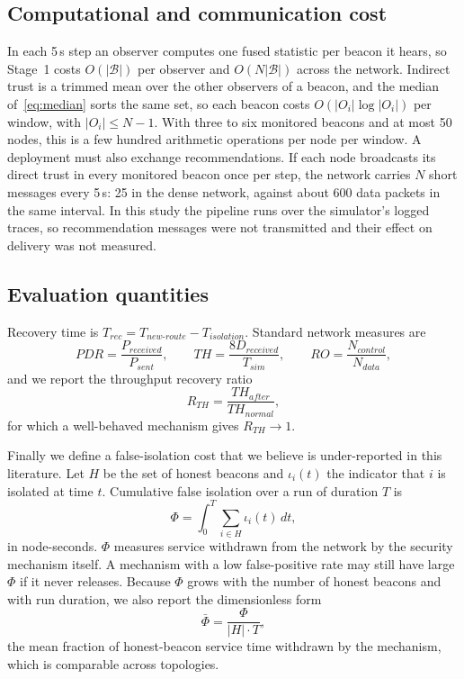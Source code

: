 \subsection{Computational and communication cost}
\label{sec:cost}

In each 5\,s step an observer computes one fused statistic per beacon it
hears, so Stage~1 costs $O(|\mathcal{B}|)$ per observer and
$O(N|\mathcal{B}|)$ across the network. Indirect trust is a trimmed mean over
the other observers of a beacon, and the median of~\eqref{eq:median} sorts the
same set, so each beacon costs $O(|O_i| \log |O_i|)$ per window, with
$|O_i| \le N-1$. With three to six monitored beacons and at most 50 nodes,
this is a few hundred arithmetic operations per node per window. A deployment
must also exchange recommendations. If each node broadcasts its direct trust
in every monitored beacon once per step, the network carries $N$ short
messages every 5\,s: 25 in the dense network, against about 600 data packets
in the same interval. In this study the pipeline runs over the simulator's
logged traces, so recommendation messages were not transmitted and their
effect on delivery was not measured.

\subsection{Evaluation quantities}

Recovery time is $T_{rec} = T_{new\text{-}route} - T_{isolation}$. Standard
network measures are
\begin{equation}
\label{eq:netm}
PDR = \frac{P_{received}}{P_{sent}}, \qquad
TH = \frac{8 D_{received}}{T_{sim}}, \qquad
RO = \frac{N_{control}}{N_{data}},
\end{equation}
and we report the throughput recovery ratio
\begin{equation}
\label{eq:recov}
R_{TH} = \frac{TH_{after}}{TH_{normal}},
\end{equation}
for which a well-behaved mechanism gives $R_{TH} \to 1$.

Finally we define a false-isolation cost that we believe is under-reported in
this literature. Let $H$ be the set of honest beacons and $\iota_i(t)$ the
indicator that $i$ is isolated at time $t$. Cumulative false isolation over a
run of duration $T$ is
\begin{equation}
\label{eq:Phi}
\Phi = \int_0^T \sum_{i \in H} \iota_i(t)\, dt,
\end{equation}
in node-seconds. $\Phi$ measures service withdrawn from the network by the
security mechanism itself. A mechanism with a low false-positive rate may
still have large $\Phi$ if it never releases. Because $\Phi$ grows with the
number of honest beacons and with run duration, we also report the
dimensionless form
\begin{equation}
\label{eq:Phibar}
\bar\Phi = \frac{\Phi}{|H| \cdot T},
\end{equation}
the mean fraction of honest-beacon service time withdrawn by the mechanism,
which is comparable across topologies.
